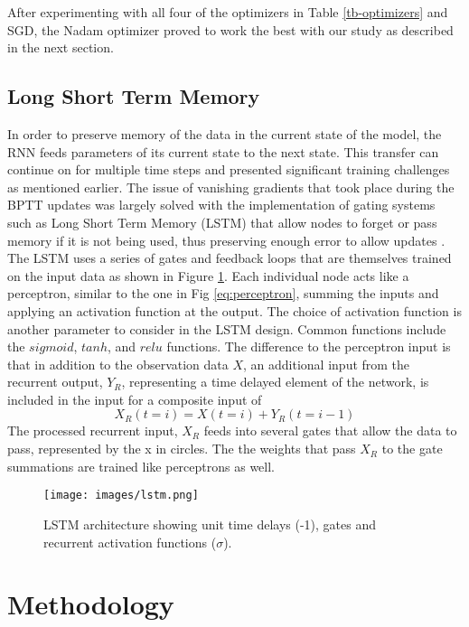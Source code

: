 \documentclass[preprint,12pt,authoryear]{elsarticle}
\begin{document}
	
\begin{linenumbers}
%
After experimenting with all four of the optimizers in Table \ref{tb-optimizers} and SGD, the Nadam optimizer proved to work the best with our study as described in the next section.

\subsection{Long Short Term Memory}

In order to preserve memory of the data in the current state of the model, the RNN feeds parameters of its current state to the next state. This transfer can continue on for multiple time steps and presented significant training challenges as mentioned earlier. The issue of vanishing gradients that took place during the BPTT updates was largely solved with the implementation of gating systems such as Long Short Term Memory (LSTM) that allow nodes to forget or pass memory if it is not being used, thus preserving enough error to allow updates \citep{Hochreiter1997}. The LSTM uses a series of gates and feedback loops that are themselves trained on the input data as shown in Figure \ref{fig:lstm}. Each individual node acts like a perceptron, similar to the one in Fig \ref{eq:perceptron}, summing the inputs and applying an activation function at the output. The choice of activation function is another parameter to consider in the LSTM design. Common functions include the $sigmoid$, $tanh$, and $relu$ functions. The difference to the perceptron input is that in addition to the observation data $X$, an additional input from the recurrent output, $Y_{R}$, representing a time delayed element of the network, is included in the input for a composite input of 
%
\begin{equation}
\label{eq:Xr}
X_{R}(t=i) = X(t=i) + Y_{R}(t=i-1)
\end{equation}
%
The processed recurrent input, $X_{R}$ feeds into several gates that allow the data to pass, represented by the x in circles. The the weights that pass $X_{R}$ to the gate summations are trained like perceptrons as well.
%
\begin{figure}[H]
\centering
\texttt{[image: images/lstm.png]} 
\caption{LSTM architecture showing unit time delays (-1), gates and recurrent activation functions ($\sigma$).}
\label{fig:lstm}
\end{figure}
%

\section{Methodology}


\end{linenumbers}
\end{document}

